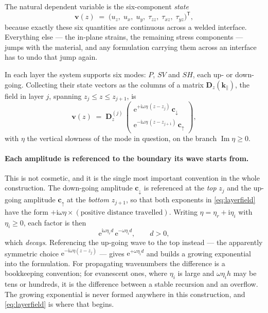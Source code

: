 \documentclass[11pt,a4paper]{article}
\newcommand{\ii}{\mathrm{i}}
\newcommand{\bD}{\mathbf{D}}
\newcommand{\bv}{\mathbf{v}}
\newcommand{\kpar}{\mathbf{k}_{\parallel}}
\begin{document}
The natural dependent variable is the six-component \emph{state}
\begin{equation}\label{eq:state}
  \bv(z) \;=\; \bigl(u_z,\;u_x,\;u_y,\;\tau_{zz},\;\tau_{xz},\;\tau_{yz}\bigr)^{\mathsf T},
\end{equation}
because exactly these six quantities are continuous across a welded interface.
Everything else --- the in-plane strains, the remaining stress components ---
jumps with the material, and any formulation carrying them across an interface
has to undo that jump again.

In each layer the system supports six modes: $P$, $SV$ and $SH$, each up- or
down-going. Collecting their state vectors as the columns of a matrix
$\bD_z(\kpar)$, the field in layer $j$, spanning $z_j\le z\le z_{j+1}$, is
\begin{equation}\label{eq:layerfield}
  \bv(z) \;=\; \bD_{z}^{(j)}\,
  \begin{pmatrix}\mathrm{e}^{+\ii\omega\eta\,(z-z_j)}\,\mathbf{c}_{\downarrow}\\[2pt]
                 \mathrm{e}^{-\ii\omega\eta\,(z-z_{j+1})}\,\mathbf{c}_{\uparrow}\end{pmatrix},
\end{equation}
with $\eta$ the vertical slowness of the mode in question, on the branch
$\operatorname{Im}\eta\ge0$.

\paragraph{Each amplitude is referenced to the boundary its wave starts from.}
This is not cosmetic, and it is the single most important convention in the
whole construction. The down-going amplitude $\mathbf{c}_{\downarrow}$ is
referenced at the \emph{top} $z_j$ and the up-going amplitude
$\mathbf{c}_{\uparrow}$ at the \emph{bottom} $z_{j+1}$, so that both exponents
in \eqref{eq:layerfield} have the form $+\ii\omega\eta\times(\text{positive
distance travelled})$. Writing $\eta=\eta_r+\ii\eta_i$ with $\eta_i\ge0$, each
factor is then
\[
  \mathrm{e}^{\ii\omega\eta_r d}\,\mathrm{e}^{-\omega\eta_i d},\qquad d>0,
\]
which \emph{decays}. Referencing the up-going wave to the top instead --- the
apparently symmetric choice $\mathrm{e}^{-\ii\omega\eta(z-z_j)}$ --- gives
$\mathrm{e}^{+\omega\eta_i d}$ and builds a growing exponential into the
formulation. For propagating wavenumbers the difference is a bookkeeping
convention; for evanescent ones, where $\eta_i$ is large and $\omega\eta_i h$
may be tens or hundreds, it is the difference between a stable recursion and an
overflow. The growing exponential is never formed anywhere in this construction,
and \eqref{eq:layerfield} is where that begins.
\end{document}
